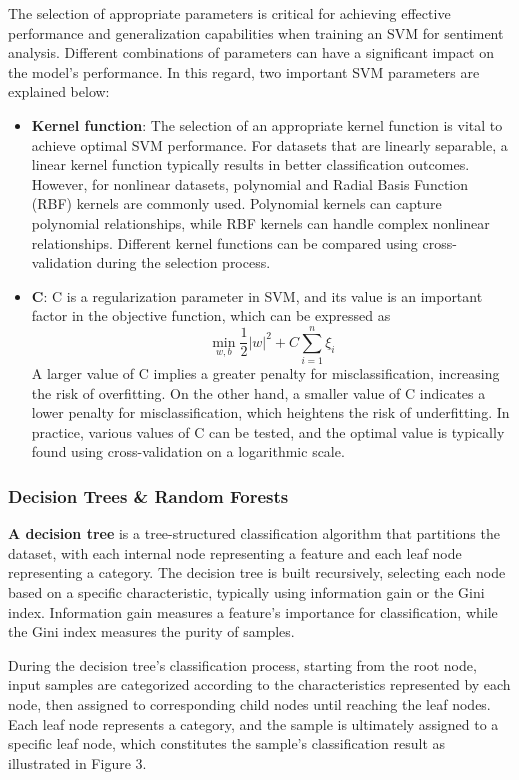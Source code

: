 \documentclass[a4paper]{article}
\begin{document}
The selection of appropriate parameters is critical for achieving effective performance and generalization capabilities when training an SVM for sentiment analysis. Different combinations of parameters can have a significant impact on the model's performance. In this regard, two important SVM parameters are explained below:
\begin{itemize}
    \item \textbf{Kernel function}: The selection of an appropriate kernel function is vital to achieve optimal SVM performance. For datasets that are linearly separable, a linear kernel function typically results in better classification outcomes. However, for nonlinear datasets, polynomial and Radial Basis Function (RBF) kernels are commonly used. Polynomial kernels can capture polynomial relationships, while RBF kernels can handle complex nonlinear relationships. Different kernel functions can be compared using cross-validation during the selection process.\cite{ref_svm1}
    \item \textbf{C}: C is a regularization parameter in SVM, and its value is an important factor in the objective function, which can be expressed as $$\min_{w, b} \frac{1}{2} |w|^2 + C \sum_{i=1}^n \xi_i$$A larger value of C implies a greater penalty for misclassification, increasing the risk of overfitting. On the other hand, a smaller value of C indicates a lower penalty for misclassification, which heightens the risk of underfitting. In practice, various values of C can be tested, and the optimal value is typically found using cross-validation on a logarithmic scale. \cite{ref_svm3}
\end{itemize}

\subsubsection{Decision Trees \& Random Forests}

\textbf{A decision tree} is a tree-structured classification algorithm that partitions the dataset, with each internal node representing a feature and each leaf node representing a category. The decision tree is built recursively, selecting each node based on a specific characteristic, typically using information gain or the Gini index. Information gain measures a feature's importance for classification, while the Gini index measures the purity of samples.

During the decision tree's classification process, starting from the root node, input samples are categorized according to the characteristics represented by each node, then assigned to corresponding child nodes until reaching the leaf nodes. Each leaf node represents a category, and the sample is ultimately assigned to a specific leaf node, which constitutes the sample's classification result as illustrated in Figure 3.\cite{ref_dt2}
\end{document}
